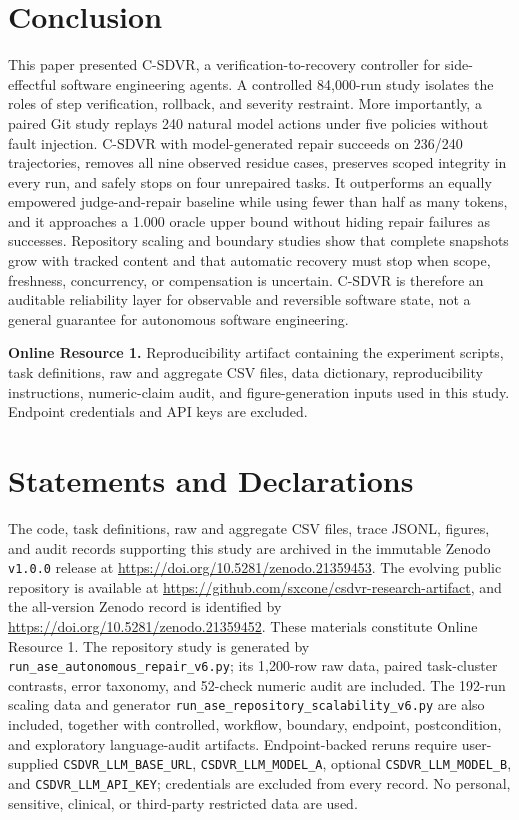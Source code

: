 \documentclass[pdflatex,sn-apa]{sn-jnl}
\begin{document}
\section{Conclusion}

This paper presented C-SDVR, a verification-to-recovery controller for side-effectful software engineering agents. A controlled 84,000-run study isolates the roles of step verification, rollback, and severity restraint. More importantly, a paired Git study replays 240 natural model actions under five policies without fault injection. C-SDVR with model-generated repair succeeds on 236/240 trajectories, removes all nine observed residue cases, preserves scoped integrity in every run, and safely stops on four unrepaired tasks. It outperforms an equally empowered judge-and-repair baseline while using fewer than half as many tokens, and it approaches a 1.000 oracle upper bound without hiding repair failures as successes. Repository scaling and boundary studies show that complete snapshots grow with tracked content and that automatic recovery must stop when scope, freshness, concurrency, or compensation is uncertain. C-SDVR is therefore an auditable reliability layer for observable and reversible software state, not a general guarantee for autonomous software engineering.

\backmatter


\textbf{Online Resource 1.} Reproducibility artifact containing the experiment scripts, task definitions, raw and aggregate CSV files, data dictionary, reproducibility instructions, numeric-claim audit, and figure-generation inputs used in this study. Endpoint credentials and API keys are excluded.

\section*{Statements and Declarations}


The code, task definitions, raw and aggregate CSV files, trace JSONL, figures, and audit records supporting this study are archived in the immutable Zenodo \texttt{v1.0.0} release at \url{https://doi.org/10.5281/zenodo.21359453}. The evolving public repository is available at \url{https://github.com/sxcone/csdvr-research-artifact}, and the all-version Zenodo record is identified by \url{https://doi.org/10.5281/zenodo.21359452}. These materials constitute Online Resource 1. The repository study is generated by \texttt{run\_ase\_autonomous\_repair\_v6.py}; its 1,200-row raw data, paired task-cluster contrasts, error taxonomy, and 52-check numeric audit are included. The 192-run scaling data and generator \texttt{run\_ase\_repository\_scalability\_v6.py} are also included, together with controlled, workflow, boundary, endpoint, postcondition, and exploratory language-audit artifacts. Endpoint-backed reruns require user-supplied \texttt{CSDVR\_LLM\_BASE\_URL}, \texttt{CSDVR\_LLM\_MODEL\_A}, optional \texttt{CSDVR\_LLM\_MODEL\_B}, and \texttt{CSDVR\_LLM\_API\_KEY}; credentials are excluded from every record. No personal, sensitive, clinical, or third-party restricted data are used.
\end{document}
